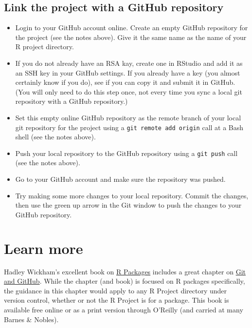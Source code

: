 \documentclass[]{tufte-book}
\providecommand{\tightlist}{%
  \setlength{\itemsep}{0pt}\setlength{\parskip}{0pt}}
\begin{document}
\hypertarget{link-the-project-with-a-github-repository}{%
\subsection{Link the project with a GitHub repository}\label{link-the-project-with-a-github-repository}}

\begin{itemize}
\tightlist
\item
  Login to your GitHub account online. Create an empty GitHub repository for the
  project (see the notes above). Give it the same name as the name of your R project directory.
\item
  If you do not already have an RSA kay, create one in RStudio and add it as an
  SSH key in your GitHub settings. If you already have a key (you almost certainly
  know if you do), see if you can copy it and submit it in GitHub. (You will only need
  to do this step once, not every time you sync a local git repository with a GitHub
  repository.)
\item
  Set this empty online GitHub repository as the remote branch of your local git
  repository for the project using a \texttt{git\ remote\ add\ origin} call at a Bash shell
  (see the notes above).
\item
  Push your local repository to the GitHub repository using a \texttt{git\ push} call
  (see the notes above).
\item
  Go to your GitHub account and make sure the repository was pushed.
\item
  Try making some more changes to your local repository. Commit the changes,
  then use the green up arrow in the Git window to push the changes to your GitHub
  repository.
\end{itemize}

\hypertarget{learn-more-1}{%
\section{Learn more}\label{learn-more-1}}

Hadley Wickham's excellent book on \href{http://r-pkgs.had.co.nz/}{R Packages} includes a great
chapter on \href{http://r-pkgs.had.co.nz/git.html}{Git and GitHub}. While the chapter (and book) is
focused on R packages specifically, the guidance in this chapter would apply to any
R Project directory under version control, whether or not the R Project is for a package.
This book is available free online or as a print version through O'Reilly (and
carried at many Barnes \& Nobles).
\end{document}
